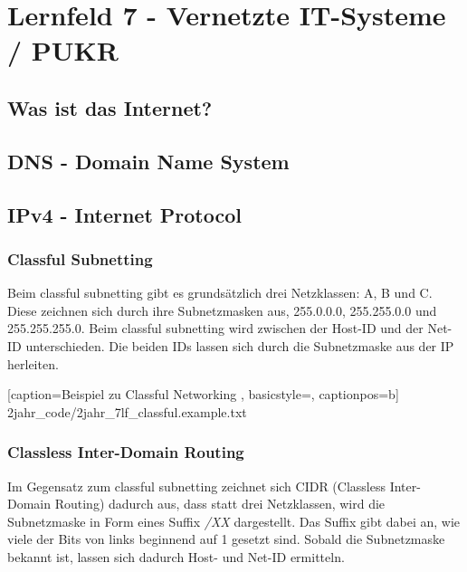 \section{Lernfeld 7 - Vernetzte IT-Systeme / PUKR} %

\subsection{Was ist das Internet?}


\subsection{DNS - Domain Name System}


\subsection{IPv4 - Internet Protocol}

\subsubsection{Classful Subnetting}

Beim classful subnetting gibt es grundsätzlich drei Netzklassen: A, B und C. Diese zeichnen sich durch ihre Subnetzmasken aus, 255.0.0.0, 255.255.0.0 und 255.255.255.0. Beim classful subnetting wird zwischen der Host-ID und der Net-ID unterschieden. Die beiden IDs lassen sich durch die Subnetzmaske aus der IP herleiten.


	[caption={Beispiel zu Classful Networking}
	\label{lst:7lf_classful.example},
	basicstyle=\small,
	captionpos=b]
	{2jahr_code/2jahr_7lf_classful.example.txt}

\subsubsection{Classless Inter-Domain Routing}

Im Gegensatz zum classful subnetting zeichnet sich CIDR (Classless Inter-Domain Routing) dadurch aus, dass statt drei Netzklassen, wird die Subnetzmaske in Form eines Suffix {\it /XX} dargestellt. Das Suffix gibt dabei an, wie viele der Bits von links beginnend auf 1 gesetzt sind. Sobald die Subnetzmaske bekannt ist, lassen sich dadurch Host- und Net-ID ermitteln.


